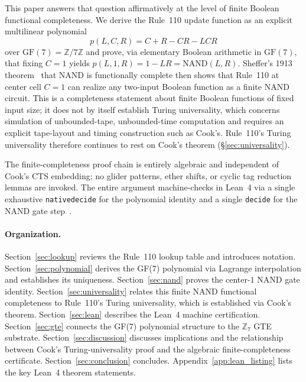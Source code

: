 \documentclass[11pt]{article}
\theoremstyle{remark}
\newcommand{\lean}[1]{%
  \penalty-100
  \begingroup\def\_{\textunderscore\allowbreak}\texttt{#1}\endgroup}
\begin{document}
This paper answers that question affirmatively at the level of finite Boolean
functional completeness.
We derive the Rule~110 update function as an explicit multilinear polynomial
\[
  p(L,C,R) = C + R - CR - LCR
\]
over $\mathrm{GF}(7) = \mathbb{Z}/7\mathbb{Z}$ and prove, via elementary Boolean
arithmetic in $\mathrm{GF}(7)$, that fixing $C = 1$ yields $p(L,1,R) = 1 - LR = \mathrm{NAND}(L,R)$.
Sheffer's 1913 theorem~\cite{Sheffer1913} that NAND is functionally complete then
shows that Rule~110 at center cell $C=1$ can realize any two-input Boolean function
as a finite NAND circuit.
This is a completeness statement about finite Boolean functions of fixed input
size; it does not by itself establish Turing universality, which concerns
simulation of unbounded-tape, unbounded-time computation and requires an explicit
tape-layout and timing construction such as Cook's.
Rule~110's Turing universality therefore continues to rest on Cook's theorem
(\S\ref{sec:universality}).

The finite-completeness proof chain is entirely algebraic and independent of
Cook's CTS embedding; no glider patterns, ether shifts, or cyclic tag reduction
lemmas are invoked.
The entire argument machine-checks in Lean~4 via a single exhaustive
\lean{native\_decide} for the polynomial identity and a single
\lean{decide} for the NAND gate step~\cite{rule110-lean}.

\paragraph{Organization.}
Section~\ref{sec:lookup} reviews the Rule~110 lookup table and introduces notation.
Section~\ref{sec:polynomial} derives the GF(7) polynomial via Lagrange interpolation
and establishes its uniqueness.
Section~\ref{sec:nand} proves the center-$1$ NAND gate identity.
Section~\ref{sec:universality} relates this finite NAND functional completeness
to Rule~110's Turing universality, which is established via Cook's theorem.
Section~\ref{sec:lean} describes the Lean~4 machine certification.
Section~\ref{sec:gte} connects the GF(7) polynomial structure to the $\mathbb{Z}_7$
GTE substrate.
Section~\ref{sec:discussion} discusses implications and the relationship between
Cook's Turing-universality proof and the algebraic finite-completeness certificate.
Section~\ref{sec:conclusion} concludes.
Appendix~\ref{app:lean_listing} lists the key Lean~4 theorem statements.
\end{document}
